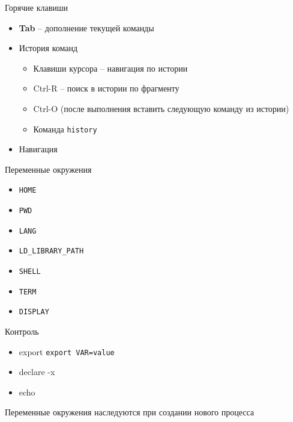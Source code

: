 \begin{frame}{Горячие клавиши}
  \begin{itemize}
    \item \textbf{Tab} -- дополнение текущей команды
      \pause
    \item История команд
      \begin{itemize}
        \item Клавиши курсора -- навигация по истории
        \item Ctrl-R -- поиск в истории по фрагменту
        \item Ctrl-O (после выполнения вставить следующую команду из истории)
        \item Команда {\tt history}
      \end{itemize}
    \item Навигация

  \end{itemize}
\end{frame}

\begin{frame}{Переменные окружения}
  \begin{itemize}
    \item {\tt HOME}
    \item {\tt PWD}
    \item {\tt LANG}
    \item {\tt LD\_LIBRARY\_PATH}
    \item {\tt SHELL}
    \item {\tt TERM}
    \item {\tt DISPLAY}
  \end{itemize}

  Контроль

  \begin{itemize}
    \item export {\tt export VAR=value}
    \item declare -x
    \item echo 
  \end{itemize}

  Переменные окружения наследуются при создании нового процесса
\end{frame}

